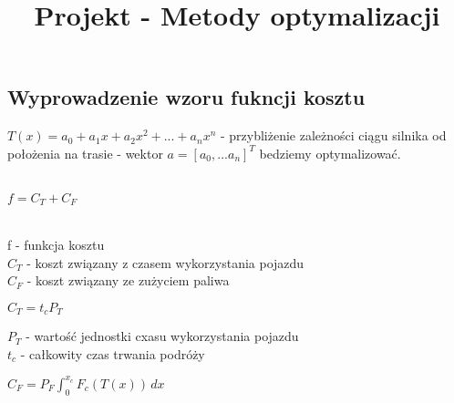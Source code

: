 \documentclass[12pt, letterpaper, twoside]{article}
\title{Projekt - Metody optymalizacji}
\author{}
\date{}
\begin{document}
\maketitle 

\begin{center}
\section*{Wyprowadzenie wzoru fukncji kosztu}
\end{center}
\( T(x) = a_0 + a_1x + a_2x^2 + ... +a_nx^n \)  - przybliżenie zależno{{\' s}}ci ciągu silnika od położenia na trasie - wektor \(a = [ a_0, ... a_n ]^T\) bedziemy optymalizować. \\\\
\centerline{\( f = C_T + C_F\)} \\
f - funkcja kosztu \\
\(C_T\) - koszt związany z czasem wykorzystania pojazdu \\
\(C_F\) - koszt związany ze zużyciem paliwa \\

\begin{center}
\(C_T = t_cP_T\) \\
\end{center}
\(P_T\) - warto{{\' s}}ć jednostki cxasu wykorzystania pojazdu\\
\(t_c\) - całkowity czas trwania podróży

\begin{center}
\(C_F = P_F \int_{0}^{x_c} F_c(T(x)) \,dx \) \\
\end{center}
\end{document}
